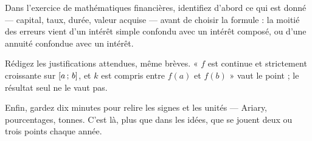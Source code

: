Dans l'exercice de mathématiques financières, identifiez d'abord ce qui est
donné — capital, taux, durée, valeur acquise — avant de choisir la formule :
la moitié des erreurs vient d'un intérêt simple confondu avec un intérêt
composé, ou d'une annuité confondue avec un intérêt.

Rédigez les justifications attendues, même brèves. « $f$ est continue et
strictement croissante sur $\left[a\,;\,b\right]$, et $k$ est compris entre
$f(a)$ et $f(b)$ » vaut le point ; le résultat seul ne le vaut pas.

Enfin, gardez dix minutes pour relire les signes et les unités — Ariary,
pourcentages, tonnes. C'est là, plus que dans les idées, que se jouent deux
ou trois points chaque année.
